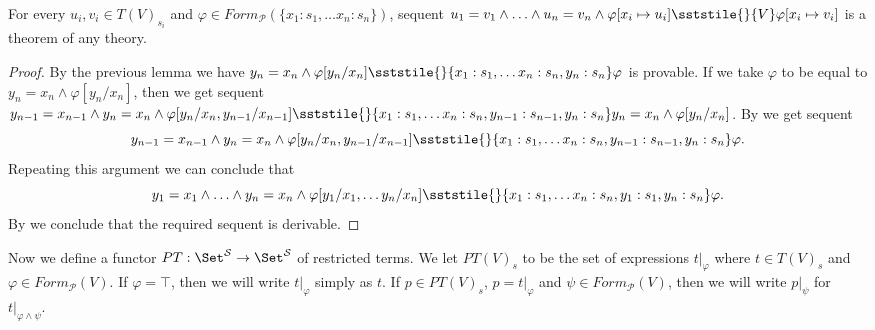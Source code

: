 \begin{lem}[cong-b]
For every $u_i,v_i \in T(V)_{s_i}$ and $\varphi \in Form_\mathcal{P}(\{ x_1 : s_1, \ldots x_n : s_n\})$,
sequent $u_1 = v_1 \land \ldots \land u_n = v_n \land \varphi[x_i \mapsto u_i] \sststile{}{V} \varphi[x_i \mapsto v_i]$ is a theorem of any theory.
\end{lem}
\begin{proof}
By the previous lemma we have $y_n = x_n \land \varphi[y_n/x_n] \sststile{}{x_1 : s_1, \ldots x_n : s_n, y_n : s_n} \varphi$ is provable.
If we take $\varphi$ to be equal to $y_n = x_n \land \varphi[y_n/x_n]$, then we get sequent
$y_{n-1} = x_{n-1} \land y_n = x_n \land \varphi[y_n/x_n,y_{n-1}/x_{n-1}] \sststile{}{x_1 : s_1, \ldots x_n : s_n, y_{n-1} : s_{n-1}, y_n : s_n} y_n = x_n \land \varphi[y_n/x_n]$.
By  we get sequent
\[ y_{n-1} = x_{n-1} \land y_n = x_n \land \varphi[y_n/x_n,y_{n-1}/x_{n-1}] \sststile{}{x_1 : s_1, \ldots x_n : s_n, y_{n-1} : s_{n-1}, y_n : s_n} \varphi. \]
Repeating this argument we can conclude that
\[ y_1 = x_1 \land \ldots \land y_n = x_n \land \varphi[y_1/x_1, \ldots y_n/x_n] \sststile{}{x_1 : s_1, \ldots x_n : s_n, y_1 : s_1, y_n : s_n} \varphi. \]
By  we conclude that the required sequent is derivable.
\end{proof}

Now we define a functor $PT : \Set^\mathcal{S} \to \Set^\mathcal{S}$ of restricted terms.
We let $PT(V)_s$ to be the set of expressions $t|_\varphi$ where $t \in T(V)_s$ and $\varphi \in Form_\mathcal{P}(V)$.
If $\varphi = \top$, then we will write $t|_\varphi$ simply as $t$.
If $p \in PT(V)_s$, $p = t|_\varphi$ and $\psi \in Form_\mathcal{P}(V)$, then we will write $p|_\psi$ for $t|_{\varphi \land \psi}$.

